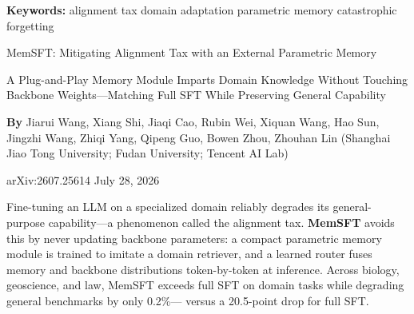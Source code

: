 \documentclass[10pt,twocolumn]{article}
\begin{document}
\setlength{\parindent}{0pt}
\setlength{\parskip}{4pt}

{\small\color{keywordgray}\textbf{Keywords:}
  alignment tax \textbullet{}
  domain adaptation \textbullet{}
  parametric memory \textbullet{}
  catastrophic forgetting}\par\vspace{4pt}

{\LARGE\bfseries\raggedright
  MemSFT: Mitigating Alignment Tax with an
  External Parametric Memory}\par\vspace{4pt}

{\large\itshape\raggedright
  A Plug-and-Play Memory Module Imparts Domain Knowledge Without
  Touching Backbone Weights---Matching Full SFT While Preserving
  General Capability}\par\vspace{6pt}

{\small\textbf{By} Jiarui Wang, Xiang Shi, Jiaqi Cao, Rubin Wei,
  Xiquan Wang, Hao Sun, Jingzhi Wang, Zhiqi Yang, Qipeng Guo,
  Bowen Zhou, Zhouhan Lin
  (Shanghai Jiao Tong University; Fudan University; Tencent AI Lab)}\par\vspace{2pt}

{\small\color{keywordgray}arXiv:2607.25614 \textbullet{} July 28, 2026}
\par\vspace{2pt}\noindent{\color{rulered}\rule{\columnwidth}{0.6pt}}\vspace{6pt}

Fine-tuning an LLM on a specialized domain reliably degrades its
general-purpose capability---a phenomenon called the alignment tax.
\textbf{MemSFT} avoids this by never updating backbone parameters: a
compact parametric memory module is trained to imitate a domain retriever,
and a learned router fuses memory and backbone distributions token-by-token
at inference. Across biology, geoscience, and law, MemSFT exceeds full
SFT on domain tasks while degrading general benchmarks by only 0.2\%---
versus a 20.5-point drop for full SFT.
\end{document}
